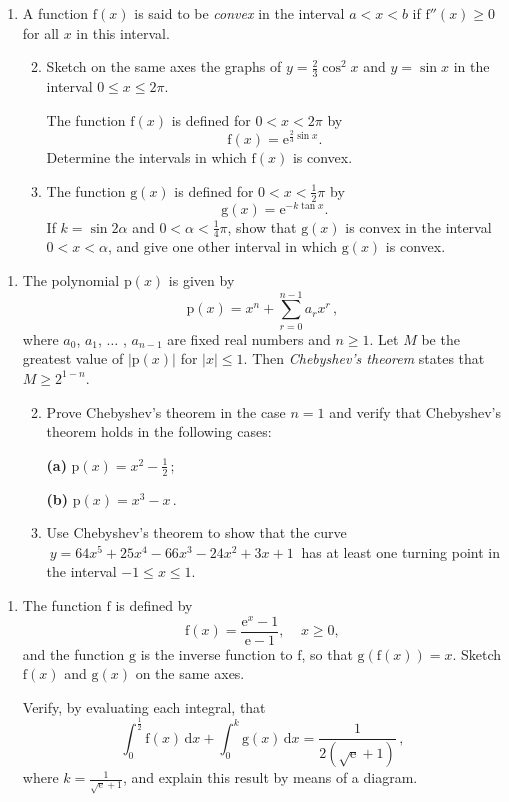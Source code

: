 \documentclass[a4, 11pt]{report}
\newlength{\qspace}
\newcounter{qnumber}
\newenvironment{question}%
 {\vspace{\qspace}
  \begin{enumerate}[\bfseries 1\quad][10]%
    \setcounter{enumi}{\value{qnumber}}%
    \item%
 }
{
  \end{enumerate}
  \filbreak
  \stepcounter{qnumber}
 }
\newenvironment{questionparts}[1][1]%
 {
  \begin{enumerate}[\bfseries (i)]%
    \setcounter{enumii}{#1}
    \addtocounter{enumii}{-1}
    \setlength{\itemsep}{5mm}
    \setlength{\parskip}{8pt}
 }
 {
  \end{enumerate}
 }
\def\d{{\mathrm d}}
\def\e{{\mathrm e}}
\def\g{{\mathrm g}}
\def\f{{\mathrm f}}
\def\p{{\mathrm p}}
\def\le{\leqslant}
\def\ge{\geqslant}
\newcommand{\ds}{\displaystyle}
\begin{document}
\begin{question}
A function $\f(x)$ is said to be {\em convex} in the interval
 $a< x < b$
if $\f''(x)\ge0$ for all $x$ in this interval.

\begin{questionparts}
\item Sketch on the same axes the graphs of $y= \frac23 \cos^2 x$ and
  $y=\sin x$ in the interval $0\le x \le 2\pi$.

The function $\f(x)$ is defined for $0<x< 2\pi$ by
\[\f(x) = \e^{\frac23 \sin x}.
\]
Determine the intervals in which $\f(x)$ is convex.


 \item 
The function $\g(x)$ is defined for $0< x< \frac12\pi$ by
\[\g(x) = \e^{-k \tan x}.
\]
If $k=\sin 2 \alpha$ and $0<\alpha< \frac{1}{4}\pi$, show that 
$\g(x)$ is convex in the interval
 $0<x<\alpha$, 
and give one other interval in which $\g(x)$ is convex.


\end{questionparts}
\end{question}

\begin{question}
The polynomial  $\p(x)$ is given by
\[
\ds \p(x)=  x^n +\sum\limits_{r=0}^{n-1}a_rx^r\,,
\] 
where $a_0$, $a_1$, $\ldots$ , $a_{n-1}$ are fixed real
numbers and $n\ge1$.
Let
$M$ be the greatest value of $\big\vert \p(x) \big\vert$ for $\vert x \vert\le
1$. 
Then {\em Chebyshev's theorem} states that  $M\ge 2^{1-n}$.

\begin{questionparts}
\item Prove Chebyshev's theorem in the case $n=1$
and verify that Chebyshev's theorem holds in the following cases:

{\bf (a)} $ \p(x) = x^2 - \frac12\,$;

{\bf (b)} $\p(x) = x^3 -  x \,$.

\item Use Chebyshev's theorem to show that the curve  
$ \ y= 64x^5+25x^4-66x^3-24x^2+3x+1
\ $
has at least one turning point in the
  interval
$-1\le x \le 1$.


\end{questionparts}
	\end{question}
	
\begin{question}
The function $\f$ is defined by
\[
\f(x) = \frac{\e^x-1}{\e-1},
\ \ \ \ \
x\ge0,
\]
and the function $\g$ is the inverse function to $\f$, so that
$\g(\f(x))=x$. Sketch $\f(x)$ and $\g(x)$ on the same axes.

Verify, by evaluating each integral, that
\[
\int_0^\frac12 \f(x) \,\d x + \int_0^k \g(x) \,\d x = \frac1 {2(\sqrt \e
  +1)}\,,
\]
where $\displaystyle k= \frac 1{\sqrt\e+1}$, and explain this result by means of a diagram.
\end{question}
	
\end{document}
